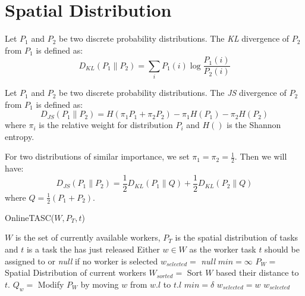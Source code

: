 \section{Spatial Distribution}

\begin{definition}
\label{def:KLD}
Let $P_1$ and $P_2$ be two discrete probability distributions. The \emph{KL} divergence of $P_2$ from $P_1$ is defined as:
\begin{equation*}
D_{KL}\left( P_1 \parallel P_2 \right) = \sum_i P_1(i) \log \frac{P_1(i)}{P_2(i)}
\end{equation*}
\end{definition}

\begin{definition}
Let $P_1$ and $P_2$ be two discrete probability distributions. The \emph{JS} divergence of $P_2$ from $P_1$ is defined as:
\begin{equation*}
D_{JS}\left( P_1 \parallel P_2 \right) = H \left( \pi_1P_1 + \pi_2P_2 \right) - \pi_1H\left( P_1 \right) - \pi_2H\left( P_2 \right)
\end{equation*}
where $\pi_i$ is the relative weight for distribution $P_i$ and $H()$ is the Shannon entropy.
\end{definition}

For two distributions of similar importance, we set $\pi_1 = \pi_2 = \frac{1}{2}$. Then we will have:
\begin{equation*}
D_{JS}\left( P_1 \parallel P_2 \right) = \frac{1}{2}D_{KL} \left( P_1 \parallel Q \right) + \frac{1}{2}D_{KL} \left( P_2 \parallel Q \right)
\end{equation*}
where $Q = \frac{1}{2} \left( P_1 + P_2 \right)$.

\begin{algorithm}
\caption{OnlineTASC($W, P_T, t$)}
\label{algo:OnlineTASC}
\begin{algorithmic}[1]
\REQUIRE $W$ is the set of currently available workers, $P_T$ is the spatial distribution of tasks and $t$ is a task the has just released
\ENSURE Either $w \in W$ as the worker task $t$ should be assigned to or \emph{null} if no worker is selected
\STATE $w_{selected} = $ \emph{null}
\STATE $min = \infty$
\STATE $P_W = $ Spatial Distribution of current workers
\STATE $W_{sorted} = $ Sort $W$ based their distance to $t$.
		\STATE $Q_w = $ Modify $P_W$ by moving $w$ from $w.l$ to $t.l$
			\STATE $min = \delta$
			\STATE $w_{selected} = w$
		\ENDIF
	\ENDIF
\ENDFOR
\RETURN $w_{selected}$
\end{algorithmic}
\end{algorithm}
